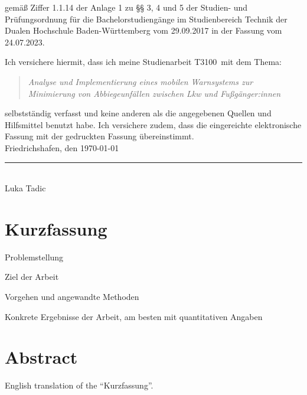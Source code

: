 \documentclass{scrbook} %
\newcommand{\titel}{Analyse und Implementierung eines mobilen Warnsystems zur Minimierung von Abbiegeunfällen zwischen Lkw und Fußgänger:innen}
\newcommand{\arbeit}{Studienarbeit T3100}
\newcommand{\autor}{Luka Tadic}
\begin{document}
gemäß Ziffer 1.1.14 der Anlage 1 zu §§ 3, 4 und 5  
der Studien- und Prüfungsordnung für die Bachelorstudiengänge im Studienbereich Technik  
der Dualen Hochschule Baden-Württemberg vom 29.09.2017 in der Fassung vom 24.07.2023.

Ich versichere hiermit, dass ich meine \arbeit\ mit dem Thema:

\begin{quote}
    \textit{\titel}
\end{quote}

selbstständig verfasst und keine anderen als die angegebenen Quellen und Hilfsmittel benutzt habe.  
Ich versichere zudem, dass die eingereichte elektronische Fassung mit der gedruckten Fassung übereinstimmt.\\[6ex]

Friedrichshafen, den \today \\[1ex]
\rule[-0.2cm]{5cm}{0.5pt} \\
\autor \\[10ex]

\rmfamily

\chapter*{Kurzfassung} %

Problemstellung

Ziel der Arbeit

Vorgehen und angewandte Methoden

Konkrete Ergebnisse der Arbeit, am besten mit quantitativen Angaben

\clearpage

\chapter*{Abstract} %

English translation of the “Kurzfassung”.

\clearpage

\end{document}
